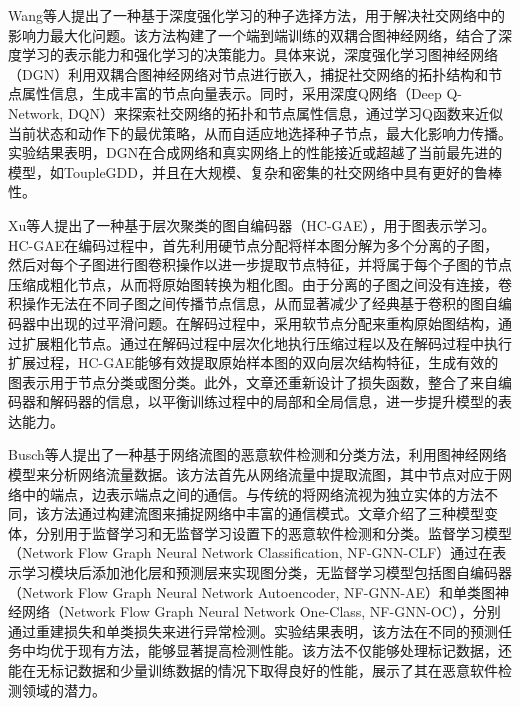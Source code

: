 \documentclass[promaster]{thesis-uestc}
\begin{document}
Wang等人提出了一种基于深度强化学习的种子选择方法，用于解决社交网络中的影响力最大化问题。该方法构建了一个端到端训练的双耦合图神经网络，结合了深度学习的表示能力和强化学习的决策能力。具体来说，深度强化学习图神经网络（DGN）利用双耦合图神经网络对节点进行嵌入，捕捉社交网络的拓扑结构和节点属性信息，生成丰富的节点向量表示。同时，采用深度Q网络（Deep Q-Network, DQN）来探索社交网络的拓扑和节点属性信息，通过学习Q函数来近似当前状态和动作下的最优策略，从而自适应地选择种子节点，最大化影响力传播。实验结果表明，DGN在合成网络和真实网络上的性能接近或超越了当前最先进的模型，如ToupleGDD，并且在大规模、复杂和密集的社交网络中具有更好的鲁棒性。

Xu等人提出了一种基于层次聚类的图自编码器（HC-GAE），用于图表示学习。HC-GAE在编码过程中，首先利用硬节点分配将样本图分解为多个分离的子图，然后对每个子图进行图卷积操作以进一步提取节点特征，并将属于每个子图的节点压缩成粗化节点，从而将原始图转换为粗化图。由于分离的子图之间没有连接，卷积操作无法在不同子图之间传播节点信息，从而显著减少了经典基于卷积的图自编码器中出现的过平滑问题。在解码过程中，采用软节点分配来重构原始图结构，通过扩展粗化节点。通过在解码过程中层次化地执行压缩过程以及在解码过程中执行扩展过程，HC-GAE能够有效提取原始样本图的双向层次结构特征，生成有效的图表示用于节点分类或图分类。此外，文章还重新设计了损失函数，整合了来自编码器和解码器的信息，以平衡训练过程中的局部和全局信息，进一步提升模型的表达能力。

Busch等人提出了一种基于网络流图的恶意软件检测和分类方法，利用图神经网络模型来分析网络流量数据。该方法首先从网络流量中提取流图，其中节点对应于网络中的端点，边表示端点之间的通信。与传统的将网络流视为独立实体的方法不同，该方法通过构建流图来捕捉网络中丰富的通信模式。文章介绍了三种模型变体，分别用于监督学习和无监督学习设置下的恶意软件检测和分类。监督学习模型（Network Flow Graph Neural Network Classification, NF-GNN-CLF）通过在表示学习模块后添加池化层和预测层来实现图分类，无监督学习模型包括图自编码器（Network Flow Graph Neural Network Autoencoder, NF-GNN-AE）和单类图神经网络（Network Flow Graph Neural Network One-Class, NF-GNN-OC），分别通过重建损失和单类损失来进行异常检测。实验结果表明，该方法在不同的预测任务中均优于现有方法，能够显著提高检测性能。该方法不仅能够处理标记数据，还能在无标记数据和少量训练数据的情况下取得良好的性能，展示了其在恶意软件检测领域的潜力。
\end{document}
